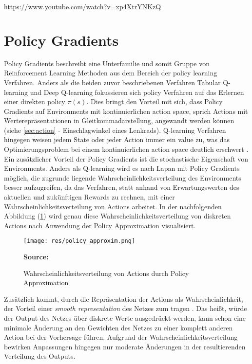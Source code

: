 \documentclass[11pt]{scrartcl}
\newcommand{\source}[1]{\vspace{-5pt} \caption*{\hfill \textbf{Source:} {#1}} }
\begin{document}
\url{https://www.youtube.com/watch?v=xp4XtrYNKzQ}

\newpage
\section{Policy Gradients}
Policy Gradients beschreibt eine Unterfamilie und somit Gruppe von Reinforcement Learning 
Methoden aus dem Bereich der policy learning Verfahren. Anders als die beiden zuvor
beschriebenen Verfahren Tabular Q-learning und Deep Q-learning fokussieren sich policy
Verfahren auf das Erlernen einer direkten policy $\pi(s)$. Dies bringt den Vorteil mit sich,
dass Policy Gradients auf Environments mit kontinuierlichen action space, sprich Actions mit
Werterepräsentationen in Gleitkommadarstellung, angewandt werden können (siehe
\ref{sec:action}  - Einschlagwinkel eines Lenkrads). Q-learning Verfahren
hingegen weisen jedem State oder jeder Action immer ein value zu, was das Optimierungsproblem
bei einem kontinuierlichen action space deutlich erschwert \cite[~S.242]{L2018}. Ein
zusätzlicher Vorteil der Policy Gradients ist die stochastische Eigenschaft von Environments.
Anders als Q-learning wird es nach Lapan\cite[~S.242]{L2018} mit Policy Gradients möglich,
die zugrunde liegende Wahrscheinlichkeitsverteilung des Environments besser aufzugreifen,
da das Verfahren, statt anhand von Erwartungswerten des aktuellen und zukünftigen Rewards zu
rechnen, mit einer Wahrscheinlichkeitsverteilung von Actions arbeitet. In der nachfolgenden
Abbildung (\ref{fig:prob-dist-pg}) wird genau diese Wahrscheinlichkeitsverteilung von
diskreten Actions nach Anwendung der Policy Approximation visualisiert.

\begin{figure}[htp]
\centering
\texttt{[image: res/policy\_approxim.png]}
\caption{Wahrscheinlichkeitsverteilung von Actions durch Policy Approximation}
\source{\cite[~S.243 - Chapter 9 - Figure 1]{L2018}}
\label{fig:prob-dist-pg}
\end{figure}

Zusätzlich kommt, durch die Repräsentation der Actions als Wahrscheinlichkeit, der Vorteil einer
\textit{smooth representation} des Netzes zum tragen \cite[~S.243]{L2018}. 
Das heißt, würde der Output des Netzes über diskrete Werte ausgedrückt werden, kann schon eine
minimale Änderung an den Gewichten des Netzes zu einer komplett anderen Action bei der
Vorhersage führen. Aufgrund der Wahrscheinlichkeitsverteilung bewirken Anpassungen hingegen
nur moderate Änderungen in der resultierenden Verteilung des Outputs.
\end{document}
